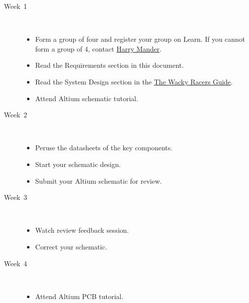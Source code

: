 \documentclass[11pt, a4paper]{article}
\makeatletter
\newcommand{\harry}{\href{mailto:harry.mander@pg.canterbury.ac.nz}{Harry Mander}}
\newcommand{\theguide}{\href{https://eng-git.canterbury.ac.nz/wacky-racers/wacky-racers/-/blob/master/doc/guide/guide.pdf}{The Wacky Racers Guide}}
\makeatother
\begin{document}
\begin{description}
\item [Week~1]\mbox{}\\[-0.4cm]

  \begin{itemize}
  \item Form a group of four and register your group on Learn.  If you
    cannot form a group of 4, contact \harry.

  \item Read the Requirements section in this document.

  \item Read the System Design section in the \theguide.

  \item Attend Altium schematic tutorial.

  \end{itemize}

\item [Week~2]\mbox{}\\[-0.4cm]

  \begin{itemize}
  \item Peruse the datasheets of the key components.

  \item Start your schematic design.

  \item Submit your Altium schematic for review.

  \end{itemize}

\item [Week~3]\mbox{}\\[-0.4cm]

  \begin{itemize}
  \item Watch review feedback session.

  \item Correct your schematic.

  \end{itemize}

\item [Week~4]\mbox{}\\[-0.4cm]

  \begin{itemize}
  \item Attend Altium PCB tutorial.


\end{itemize}
\end{description}
\end{document}

